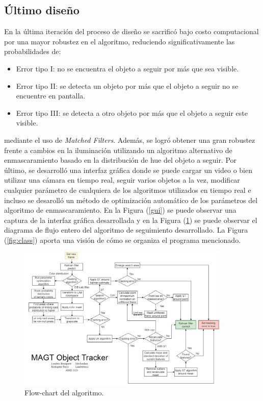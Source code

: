\subsection{Último diseño}

En la última iteración del proceso de diseño se sacrificó bajo costo computacional por una mayor robustez en el algoritmo, reduciendo significativamente las probabilidades de:
\begin{itemize}
\item Error tipo I: no se encuentra el objeto a seguir por más que sea visible.
\item Error tipo II: se detecta un objeto por más que el objeto a seguir no se encuentre en pantalla.
\item Error tipo III: se detecta a otro objeto por más que el objeto a seguir este visible.
\end{itemize}
mediante el uso de \textit{Matched Filters}. Además, se logró obtener una gran robustez frente a cambios en la iluminación utilizando un algoritmo alternativo de enmascaramiento basado en la distribución de hue del objeto a seguir. Por último, se desarrolló una interfaz gráfica donde se puede cargar un video o bien utilizar una cámara en tiempo real, seguir varios objetos a la vez, modificar cualquier parámetro de cualquiera de los algoritmos utilizados en tiempo real e incluso se desarolló un método de optimización automático de los parámetros del algoritmo de enmascaramiento. En la Figura (\ref{gui}) se puede observar una captura de la interfaz gráfica desarrollada y en la Figura (\ref{fig:Flowchart}) se puede observar el diagrama de flujo entero del algoritmo de seguimiento desarrollado. La Figura (\ref{fig:class}) aporta una visión de cómo se organiza el programa mencionado.


\begin{figure}
	\centering
	\includegraphics[width=0.9\textwidth]{../flowchart.jpg}
	\caption{Flow-chart del algoritmo.}
	\label{fig:Flowchart}
\end{figure}

